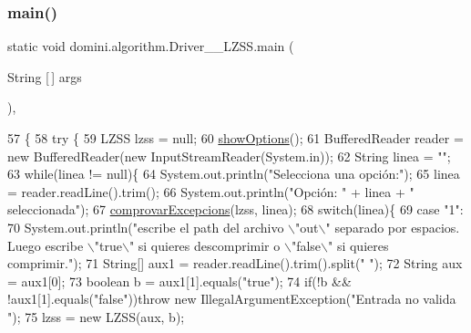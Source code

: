\subsubsection{\texorpdfstring{main()}{main()}}
{\footnotesize\ttfamily static void domini.\+algorithm.\+Driver\+\_\+\+\_\+\+L\+Z\+S\+S.\+main (\begin{DoxyParamCaption}\item[{String \mbox{[}$\,$\mbox{]}}]{args }\end{DoxyParamCaption})\hspace{0.3cm}{\ttfamily [inline]}, {\ttfamily [static]}}


\begin{DoxyCode}
57                                            \{
58     \textcolor{keywordflow}{try} \{
59         LZSS lzss = null;
60         \hyperlink{classdomini_1_1algorithm_1_1Driver____LZSS_a4362a21690fbdb3ef42dd6f8ca0f0da6}{showOptions}();
61         BufferedReader reader = \textcolor{keyword}{new} BufferedReader(\textcolor{keyword}{new} InputStreamReader(System.in));
62         String linea = \textcolor{stringliteral}{""};
63         \textcolor{keywordflow}{while}(linea != null)\{
64             System.out.println(\textcolor{stringliteral}{"Selecciona una opción:"});
65             linea = reader.readLine().trim();
66             System.out.println(\textcolor{stringliteral}{"Opción: "} + linea + \textcolor{stringliteral}{" seleccionada"});
67             \hyperlink{classdomini_1_1algorithm_1_1Driver____LZSS_a3b1983c6a71cd4d510e8434cd2e7f8f2}{comprovarExcepcions}(lzss, linea);
68             \textcolor{keywordflow}{switch}(linea)\{
69                 \textcolor{keywordflow}{case} \textcolor{stringliteral}{"1"}:
70                     System.out.println(\textcolor{stringliteral}{"escribe el path del archivo \(\backslash\)"out\(\backslash\)" separado por espacios. Luego
       escribe \(\backslash\)"true\(\backslash\)" si quieres descomprimir o \(\backslash\)"false\(\backslash\)" si quieres comprimir."});
71                     String[] aux1 = reader.readLine().trim().split(\textcolor{stringliteral}{" "});
72                     String aux = aux1[0];
73                     \textcolor{keywordtype}{boolean} b = aux1[1].equals(\textcolor{stringliteral}{"true"});
74                     \textcolor{keywordflow}{if}(!b && !aux1[1].equals(\textcolor{stringliteral}{"false"}))\textcolor{keywordflow}{throw} \textcolor{keyword}{new} IllegalArgumentException(\textcolor{stringliteral}{"Entrada no valida
      "});
75                     lzss = \textcolor{keyword}{new} LZSS(aux, b);

\end{DoxyCode}
